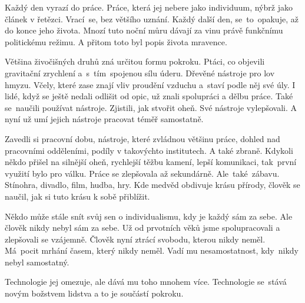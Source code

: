 \documentclass{article}
\begin{document}
	\fontsize{10pt}{10pt}\selectfont
	Každý den vyrazí do práce.
	Práce, která jej nebere jako individuum, nýbrž jako článek v řetězci.
	Vrací~se, bez většího uznání.
	Každý další den, se~to~opakuje, až do konce jeho života.
	Mnozí tuto noční můru dávají za vinu právě funkčnímu politickému režimu.
	A přitom toto byl popis života mravence.\par
	Většina živočišných druhů zná určitou formu pokroku.
	Ptáci, co objevili gravitační zrychlení a~s~tím~spojenou sílu úderu.
	Dřevěné nástroje pro lov hmyzu.
	Včely, které zase znají vliv proudění vzduchu a~staví podle něj své úly.
	I lidé, když se ještě nedali odlišit od opic, už znali spolupráci a dělbu práce.
	Také se~naučili používat nástroje.
	Zjistili, jak stvořit oheň.
	Své nástroje vylepšovali.
	A nyní už umí jejich nástroje pracovat téměř samostatně.\par
	Zavedli si pracovní dobu, nástroje, které zvládnou většinu práce, dohled nad pracovními odděleními, podíly v takovýchto institutech.
	A také zbraně.
	Kdykoli někdo přišel na silnější oheň, rychlejší těžbu kamení, lepší komunikaci, tak~první využití bylo pro válku.
	Práce se zlepšovala až sekundárně.
	Ale~také~zábavu.
	Stínohra, divadlo, film, hudba, hry.
	Kde medvěd obdivuje krásu přírody, člověk se naučil, jak si tuto krásu k sobě přiblížit.\par
	Někdo může stále snít svůj sen o individualismu, kdy je každý sám za sebe.
	Ale člověk nikdy nebyl sám za sebe.
	Už od prvotních věků jsme spolupracovali a zlepšovali se vzájemně.
	Člověk nyní ztrácí svobodu, kterou nikdy neměl.
	Má~pocit mrhání časem, který nikdy neměl.
	Vadí mu nesamostatnost, kdy~nikdy nebyl samostatný.\par
	Technologie jej omezuje, ale dává mu toho mnohem více.
	Technologie se~stává novým božstvem lidstva a to je součástí pokroku.
\end{document}
